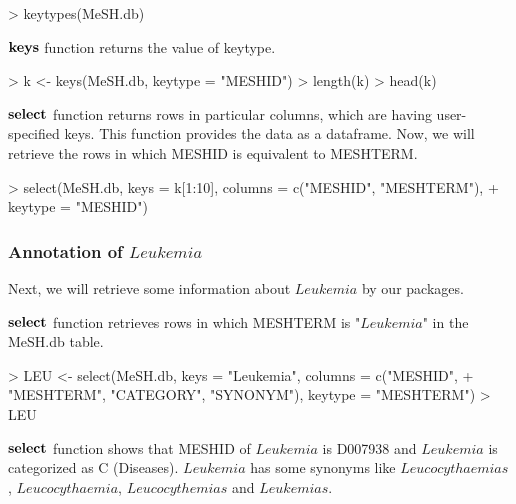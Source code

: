 \documentclass[11pt]{article}
\begin{document}
\begin{center}
\begin{Schunk}
\begin{Sinput}
> keytypes(MeSH.db)
\end{Sinput}
\end{Schunk}
\end{center}

\newpage
$\bf{keys}$ function returns the value of keytype.
\begin{center}
\begin{Schunk}
\begin{Sinput}
> k <- keys(MeSH.db, keytype = "MESHID")
> length(k)
> head(k)
\end{Sinput}
\end{Schunk}
\end{center}

$\bf{select}$ function returns rows in particular columns, which are having user-specified keys. This function provides the data as a dataframe. Now, we will retrieve the rows in which MESHID is equivalent to MESHTERM.
\begin{center}
\begin{Schunk}
\begin{Sinput}
> select(MeSH.db, keys = k[1:10], columns = c("MESHID", "MESHTERM"), 
+     keytype = "MESHID")
\end{Sinput}
\end{Schunk}
\end{center}

\newpage
\subsubsection{Annotation of $Leukemia$}
Next, we will retrieve some information about $Leukemia$ by our packages.

$\bf{select}$ function retrieves rows in which MESHTERM is "$Leukemia$" in the MeSH.db table.
\begin{center}
\begin{Schunk}
\begin{Sinput}
> LEU <- select(MeSH.db, keys = "Leukemia", columns = c("MESHID", 
+     "MESHTERM", "CATEGORY", "SYNONYM"), keytype = "MESHTERM")
> LEU
\end{Sinput}
\end{Schunk}
\end{center}

$\bf{select}$ function shows that MESHID of $Leukemia$ is D007938 and $Leukemia$ is categorized as C (Diseases). $Leukemia$ has some synonyms like $Leucocythaemias$, $Leucocythaemia$, $Leucocythemias$ and $Leukemias$.
\end{document}
